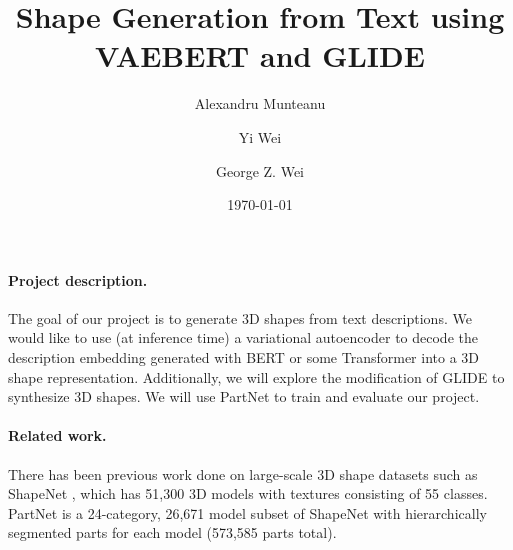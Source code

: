 \documentclass[11pt]{article}
\title{Shape Generation from Text using VAEBERT and GLIDE}
\author{
    Alexandru Munteanu
    \and
    Yi Wei
    \and
    George Z. Wei       
}
\date{\today}
\begin{document}
\maketitle

\paragraph*{Project description.}


The goal of our project is to generate 3D shapes from text descriptions. We would like to use (at inference time) a variational autoencoder to decode the description embedding generated with BERT \cite{bert} or some Transformer \cite{transformer} into a 3D shape representation. Additionally, we will explore the modification of GLIDE \cite{glide} to synthesize 3D shapes. We will use PartNet \cite{partnet} to train and evaluate our project.

\paragraph*{Related work.}


There has been previous work done on large-scale 3D shape datasets such as ShapeNet \cite{shapenet}, which has 51,300 3D models with textures consisting of 55 classes. PartNet \cite{partnet} is a 24-category, 26,671 model subset of ShapeNet with hierarchically segmented parts for each model (573,585 parts total).
\end{document}

